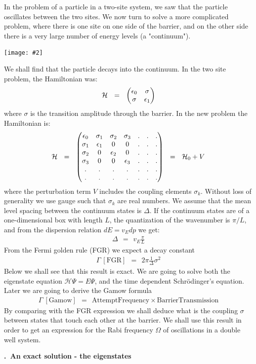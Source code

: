\documentclass[onecolumn,fleqn, 11pt]{revtex4}
\newcommand{\amatrix}[1]{\begin{matrix} #1 \end{matrix}}
\newcommand{\putgraph}[2][0.30\hsize]{\texttt{[image: \#2]}}
\newcommand{\beq}{\begin{eqnarray}}
\newcommand{\eeq}{\end{eqnarray}}
\renewcommand{\thesubsection}{\arabic{subsection}}
\renewcommand{\thesubsubsection}{\arabic{subsubsection}}
\newcommand{\sheadC}[1]
{
\addtocounter{subsubsection}{1}
\vspace{5mm}
{\bf \thesubsection.\thesubsubsection \ #1}  
\nopagebreak
\phantomsection
}
\begin{document}
In the problem of a particle in a two-site system, we saw that 
the particle oscillates between the two sites. We now turn 
to solve a more complicated problem, where there is one site 
on one side of the barrier, and on the other side there is 
a very large number of energy levels (a "continuum").


\begin{center}
\putgraph[0.4\hsize]{DiscreteLevelCoupledToContinuum2}
\end{center}


We shall find that the particle decays into the continuum. 
In the two site problem, the Hamiltonian was:
\beq
\mathcal{H} \ \ = \ \ \left(\amatrix{\epsilon_0 &\sigma \cr \sigma& \epsilon_1}\right) 
\eeq
where ${\sigma}$ is the transition amplitude through the barrier. 
In the new problem the Hamiltonian is:
\beq
\mathcal{H} 
\ \ = \ \ 
\left( 
\amatrix{ 
\epsilon_0 & \sigma_1 & \sigma_2 & \sigma_3 & . & . & . \cr 
\sigma_1 & \epsilon_1 & 0 & 0 & . & . & . \cr 
\sigma_2 & 0 & \epsilon_2 & 0 & . & . & . \cr 
\sigma_3 & 0 & 0 & \epsilon_3 & . & . & . \cr . & . & . & . & . & . & . \cr
. & . & . & . & . & . & . } 
\right) 
\ \ = \ \ \mathcal{H}_0 + V 
\eeq
where the perturbation term ${V}$ includes the coupling elements ${\sigma_k}$. 
Without loss of generality we use gauge such that $\sigma_k$ are real numbers.
We assume that the mean level spacing between the continuum states is ${\Delta}$. 
If the continuum states are of a one-dimensional box with length ${L}$, 
the quantization of the wavenumber is ${{\pi}/{L}}$, 
and from the dispersion relation ${dE = v_E dp}$ we get:
\beq
\Delta \ \ = \ \ v_E \frac{ \pi}{L} 
\eeq
From the Fermi golden rule (FGR) we expect a decay constant 
\beq
\Gamma \ [\mbox{FGR}] \ \ = \ \ 2\pi \frac{1}{\Delta} \sigma^2 
\eeq
Below we shall see that this result is exact. 
We are going to solve both the 
eigenstate equation ${\mathcal{H}\Psi = E \Psi}$, 
and the time dependent Schr\"{o}dinger's equation.
Later we are going to derive the Gamow formula 
\beq
\Gamma \ [\mbox{Gamow}] \ \ = \ \ \mbox{AttemptFrequency} \times \mbox{BarrierTransmission}
\eeq
By comparing with the FGR expression we shall deduce what 
is the coupling $\sigma$ between states that touch  
each other at the barrier. We shall use this result in 
order to get an expression for the Rabi frequency $\Omega$ 
of oscillations in a double well system. 


\sheadC{An exact solution - the eigenstates} 
\end{document}
